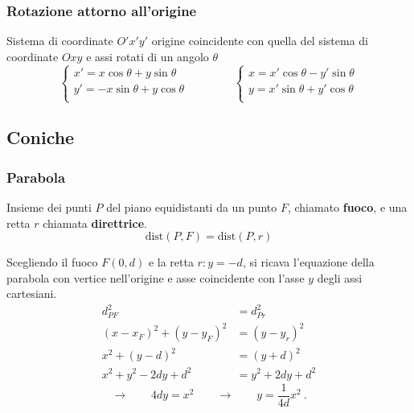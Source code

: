 \subsubsection{Rotazione attorno all'origine}
Sistema di coordinate $O'x'y'$ origine coincidente con quella del sistema di coordinate $Oxy$ e assi rotati di un angolo $\theta$
\begin{equation}
    \begin{cases}
        x' =  x \cos \theta + y \sin \theta \\
        y' = -x \sin \theta + y \cos \theta \\
    \end{cases}
    \qquad \qquad
    \begin{cases}
        x  =  x'\cos \theta - y'\sin \theta \\
        y  =  x'\sin \theta + y'\cos \theta \\
    \end{cases}
\end{equation}

\subsection{Coniche}
\subsubsection{Parabola}
\begin{definition}[Parabola] Insieme dei punti $P$ del piano equidistanti da un punto $F$, chiamato \textbf{fuoco}, e una retta $r$ chiamata \textbf{direttrice}.
\begin{equation}
    \text{dist}(P,F) = \text{dist}(P,r) 
\end{equation}
\end{definition}
Scegliendo il fuoco $F(0, d)$ e la retta $r: y=-d$, si ricava l'equazione della parabola con vertice nell'origine e asse coincidente con l'asse $y$ degli assi cartesiani.
\begin{equation}
\begin{aligned}
    d^2_{PF} & = d^2_{Pr} \\
    (x - x_F)^2 + (y - y_F)^2 & = (y-y_r)^2 \\
    x^2 + (y - d)^2 & = (y+d)^2 \\
    x^2 + y^2 - 2dy + d^2 & = y^2 + 2dy + d^2 
\end{aligned}
\end{equation}
\begin{equation}
    \rightarrow \qquad 4d y = x^2 \qquad \rightarrow \qquad y = \dfrac{1}{4d} x^2 \ .
\end{equation}

